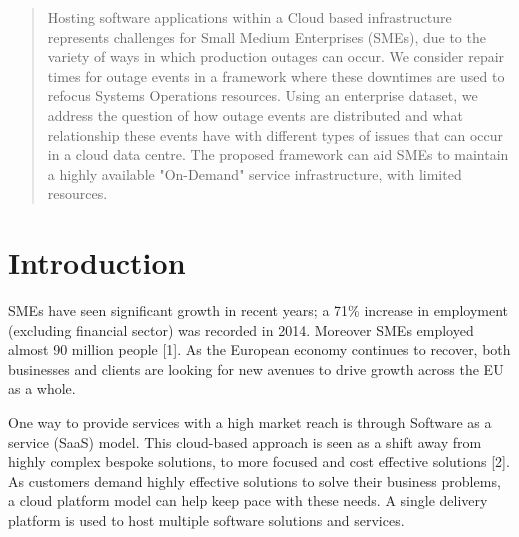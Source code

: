 \documentclass[conference]{IEEEtran}
\begin{document}
\begin{abstract}

Hosting software applications within a Cloud based infrastructure represents challenges for Small Medium Enterprises (SMEs), due to the variety of ways in which production outages can occur. We consider repair times for outage events in a framework where these downtimes are used to refocus Systems Operations resources. Using an enterprise dataset, we address the question of how outage events are distributed and what relationship these events have with different types of issues that can occur in a cloud data centre. The proposed framework can aid SMEs to maintain a highly available "On-Demand" service infrastructure, with limited resources.
\end{abstract}


%
\IEEEpeerreviewmaketitle

\section{Introduction}

SMEs have seen significant growth in recent years; a 71\% increase in employment (excluding financial sector) was recorded in 2014. Moreover SMEs employed almost 90 million people [1]. As the European economy continues to recover, both businesses and clients are looking for new avenues to drive growth across the EU as a whole. \par

One way to provide services with a high market reach is through Software as a service (SaaS) model. This cloud-based approach is seen as a shift away from highly complex bespoke solutions, to more focused and cost effective solutions [2]. As customers demand highly effective solutions to solve their business problems, a cloud platform model can help keep pace with these needs. A single delivery platform is used to host multiple software solutions and services. \par
\end{document}
